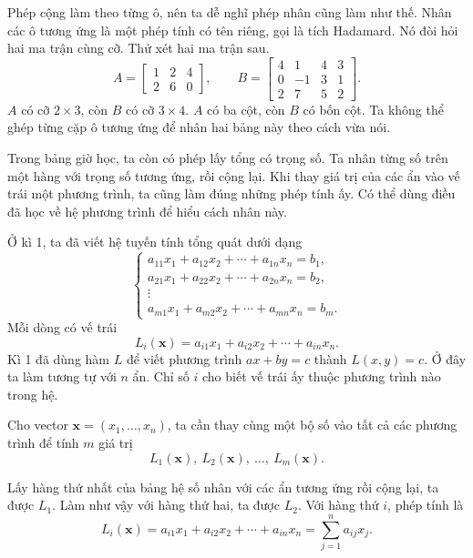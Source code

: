 \documentclass[12pt,a4paper]{article}
\begin{document}
Phép cộng làm theo từng ô, nên ta dễ nghĩ phép nhân cũng làm như thế. Nhân các ô tương ứng là một phép tính có tên riêng, gọi là tích Hadamard. Nó đòi hỏi hai ma trận cùng cỡ. Thử xét hai ma trận sau.
$$
A=\left[ \begin{array}{rrr} 1 & 2 & 4\\ 2 & 6 & 0 \end{array} \right],\qquad
B=\left[ \begin{array}{rrrr} 4 & 1 & 4 & 3\\ 0 & -1 & 3 & 1\\ 2 & 7 & 5 & 2 \end{array} \right].
$$
\(A\) có cỡ \(2\times3\), còn \(B\) có cỡ \(3\times4\). \(A\) có ba cột, còn \(B\) có bốn cột. Ta không thể ghép từng cặp ô tương ứng để nhân hai bảng này theo cách vừa nói.

Trong bảng giờ học, ta còn có phép lấy tổng có trọng số. Ta nhân từng số trên một hàng với trọng số tương ứng, rồi cộng lại. Khi thay giá trị của các ẩn vào vế trái một phương trình, ta cũng làm đúng những phép tính ấy. Có thể dùng điều đã học về hệ phương trình để hiểu cách nhân này.

Ở kì 1, ta đã viết hệ tuyến tính tổng quát dưới dạng
$$
\begin{cases}
a_{11}x_1+a_{12}x_2+\cdots+a_{1n}x_n=b_1,\\
a_{21}x_1+a_{22}x_2+\cdots+a_{2n}x_n=b_2,\\
\vdots\\
a_{m1}x_1+a_{m2}x_2+\cdots+a_{mn}x_n=b_m.
\end{cases}
$$
Mỗi dòng có vế trái
$$
L_i(\mathbf{x})=a_{i1}x_1+a_{i2}x_2+\cdots+a_{in}x_n.
$$
Kì 1 đã dùng hàm \(L\) để viết phương trình \(ax+by=c\) thành \(L(x,y)=c\). Ở đây ta làm tương tự với \(n\) ẩn. Chỉ số \(i\) cho biết vế trái ấy thuộc phương trình nào trong hệ.

Cho vector \(\mathbf{x}=(x_1,\ldots,x_n)\), ta cần thay cùng một bộ số vào tất cả các phương trình để tính \(m\) giá trị
$$
L_1(\mathbf{x}),\ L_2(\mathbf{x}),\ \ldots,\ L_m(\mathbf{x}).
$$

Lấy hàng thứ nhất của bảng hệ số nhân với các ẩn tương ứng rồi cộng lại, ta được \(L_1\). Làm như vậy với hàng thứ hai, ta được \(L_2\). Với hàng thứ \(i\), phép tính là
$$
L_i(\mathbf{x})=a_{i1}x_1+a_{i2}x_2+\cdots+a_{in}x_n=
\sum_{j=1}^{n}a_{ij}x_j. \tag{1}
$$
\end{document}
